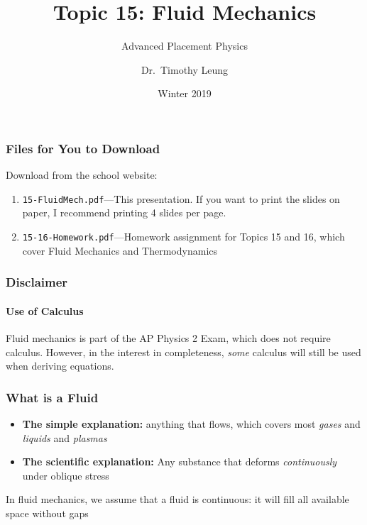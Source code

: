 \documentclass[12pt,aspectratio=169]{beamer}
\title{Topic 15: Fluid Mechanics}
\subtitle{Advanced Placement Physics}
\author[TML]{Dr.\ Timothy Leung}
\institute{Olympiads School}
\date{Winter 2019}
\begin{document}
\begin{frame}
  \maketitle
\end{frame}



\begin{frame}
  \frametitle{Files for You to Download}
  Download from the school website:
  \begin{enumerate}
  \item\texttt{15-FluidMech.pdf}---This presentation. If you want to print the
    slides on paper, I recommend printing 4 slides per page.
  \item\texttt{15-16-Homework.pdf}---Homework assignment for Topics 15 and 16,
    which cover Fluid Mechanics and Thermodynamics
  \end{enumerate}
\end{frame}



\begin{frame}
  \frametitle{Disclaimer}
  \framesubtitle{Use of Calculus}
  Fluid mechanics is part of the AP Physics 2 Exam, which does not require
  calculus. However, in the interest in completeness, \emph{some} calculus will
  still be used when deriving equations.
\end{frame}



\begin{frame}
  \frametitle{What is a Fluid}

  \begin{itemize}
  \item\textbf{The simple explanation:} anything that flows, which covers
    most \emph{gases} and \emph{liquids} and \emph{plasmas}
  \item\textbf{The scientific explanation:} Any substance that deforms
    \emph{continuously} under oblique stress
  \end{itemize}

  \vspace{.2in}In fluid mechanics, we assume that a fluid is continuous:
  it will fill all available space without gaps
\end{frame}
\end{document}
